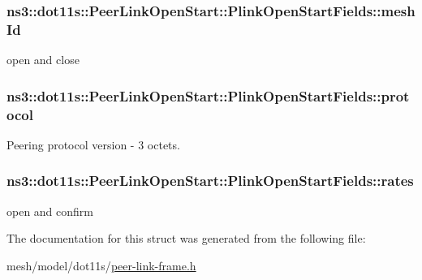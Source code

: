 \subsubsection[{\texorpdfstring{mesh\+Id}{meshId}}]{ ns3\+::dot11s\+::\+Peer\+Link\+Open\+Start\+::\+Plink\+Open\+Start\+Fields\+::mesh\+Id}\hypertarget{structns3_1_1dot11s_1_1PeerLinkOpenStart_1_1PlinkOpenStartFields_a616a9e7b3649bb9bf2ea703fc701106c}{}\label{structns3_1_1dot11s_1_1PeerLinkOpenStart_1_1PlinkOpenStartFields_a616a9e7b3649bb9bf2ea703fc701106c}


open and close 

\subsubsection[{\texorpdfstring{protocol}{protocol}}]{ ns3\+::dot11s\+::\+Peer\+Link\+Open\+Start\+::\+Plink\+Open\+Start\+Fields\+::protocol}\hypertarget{structns3_1_1dot11s_1_1PeerLinkOpenStart_1_1PlinkOpenStartFields_aa5b3188872e8c86de8ac0355a63834ee}{}\label{structns3_1_1dot11s_1_1PeerLinkOpenStart_1_1PlinkOpenStartFields_aa5b3188872e8c86de8ac0355a63834ee}


Peering protocol version -\/ 3 octets. 

\subsubsection[{\texorpdfstring{rates}{rates}}]{ ns3\+::dot11s\+::\+Peer\+Link\+Open\+Start\+::\+Plink\+Open\+Start\+Fields\+::rates}\hypertarget{structns3_1_1dot11s_1_1PeerLinkOpenStart_1_1PlinkOpenStartFields_a42c2f245c2734f9f39132d7ac2eb9fc9}{}\label{structns3_1_1dot11s_1_1PeerLinkOpenStart_1_1PlinkOpenStartFields_a42c2f245c2734f9f39132d7ac2eb9fc9}


open and confirm 



The documentation for this struct was generated from the following file\+:\begin{DoxyCompactItemize}
\item 
mesh/model/dot11s/\hyperlink{peer-link-frame_8h}{peer-\/link-\/frame.\+h}\end{DoxyCompactItemize}
